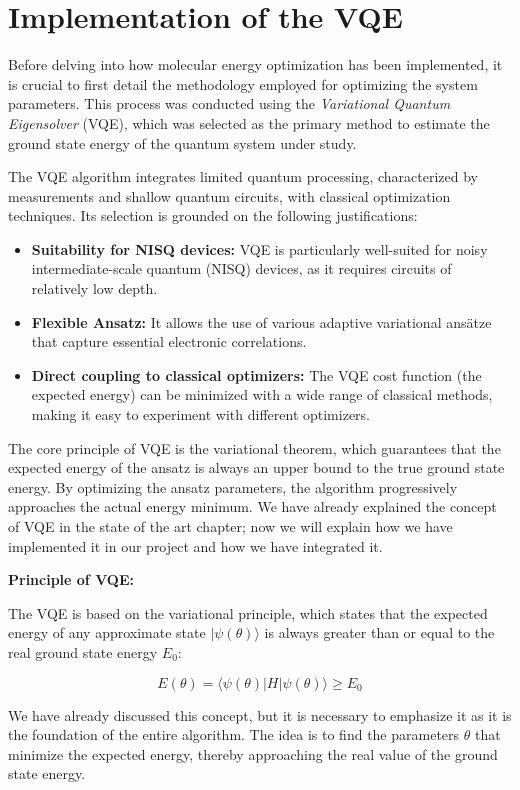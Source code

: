 \section{Implementation of the VQE}
Before delving into how molecular energy optimization has been implemented, it is crucial to first detail the methodology employed for optimizing the system parameters. This process was conducted using the \textit{Variational Quantum Eigensolver} (VQE), which was selected as the primary method to estimate the ground state energy of the quantum system under study.

The VQE algorithm integrates limited quantum processing, characterized by measurements and shallow quantum circuits, with classical optimization techniques. Its selection is grounded on the following justifications:

\begin{itemize}
    \item \textbf{Suitability for NISQ devices:} VQE is particularly well-suited for noisy intermediate-scale quantum (NISQ) devices, as it requires circuits of relatively low depth.
    \item \textbf{Flexible Ansatz:} It allows the use of various adaptive variational ansätze that capture essential electronic correlations.
    \item \textbf{Direct coupling to classical optimizers:} The VQE cost function (the expected energy) can be minimized with a wide range of classical methods, making it easy to experiment with different optimizers.
\end{itemize}

The core principle of VQE is the variational theorem, which guarantees that the expected energy of the ansatz is always an upper bound to the true ground state energy. By optimizing the ansatz parameters, the algorithm progressively approaches the actual energy minimum. We have already explained the concept of VQE in the state of the art chapter; now we will explain how we have implemented it in our project and how we have integrated it.

\begin{ProjectStructure}
    \textbf{Principle of VQE:}

    The VQE is based on the variational principle, which states that the expected energy of any approximate state \( |\psi(\theta)\rangle \) is always greater than or equal to the real ground state energy \( E_0 \):

    \[
    E(\theta) = \langle \psi(\theta) | H | \psi(\theta) \rangle \geq E_0
    \]

    We have already discussed this concept, but it is necessary to emphasize it as it is the foundation of the entire algorithm. The idea is to find the parameters \( \theta \) that minimize the expected energy, thereby approaching the real value of the ground state energy.
\end{ProjectStructure}

